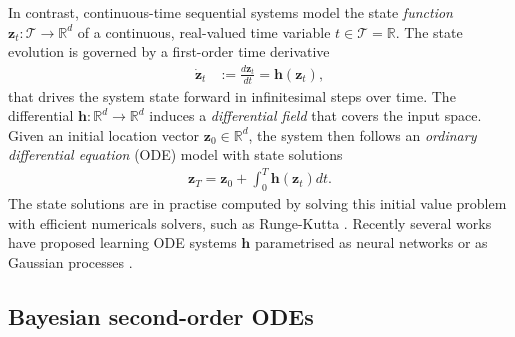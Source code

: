 \documentclass{article}
\newcommand{\z}{\mathbf{z}}
\newcommand{\dz}{\dot{\mathbf{z}}}
\newcommand{\h}{\mathbf{h}}
\newcommand{\R}{\mathbb{R}}
\newcommand{\0}{\mathbf{0}}
\begin{document}
In contrast, continuous-time sequential systems model the state \emph{function} $\z_t : \mathcal{T} \to \R^d$ of a continuous, real-valued time variable $t \in \mathcal{T} = \R$. The state evolution is governed by a first-order time derivative
\begin{align}
\dz_t &:=  \frac{d \z_t}{dt} = \h(\z_t),
\end{align}
that drives the system state forward in infinitesimal steps over time. The differential $\h : \R^d \to \R^d$ induces a \emph{differential field} that covers the input space. Given an initial location vector $\z_0 \in \R^d$, the system then follows an \emph{ordinary differential equation} (ODE) model with state solutions
\begin{align}
    \z_T = \z_0 + \int_0^T \h(\z_t) dt.
\end{align}
The state solutions are in practise computed by solving this initial value problem with efficient numericals solvers, such as Runge-Kutta \citep{schober2019probabilistic}. Recently several works have proposed learning ODE systems $\h$ parametrised as neural networks \citep{chen2018neural} or as Gaussian processes \citep{heinonen18a}.


\subsection{Bayesian second-order ODEs} \label{sec:bsoode}
\end{document}
